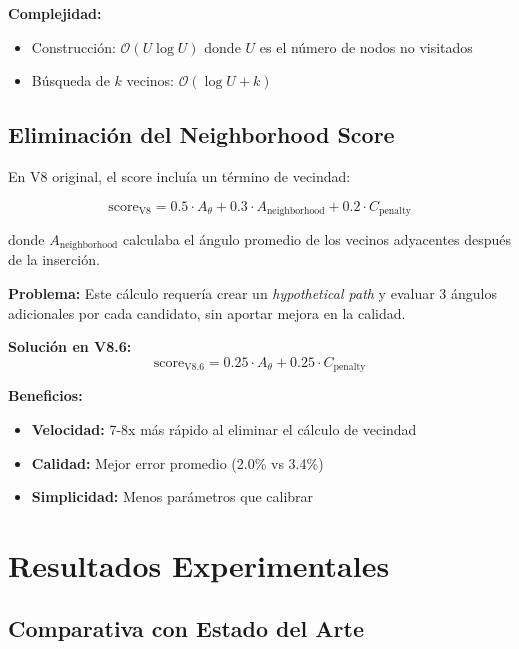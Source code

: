 \documentclass[12pt, a4paper]{article}
\begin{document}
\textbf{Complejidad:}
\begin{itemize}
    \item Construcción: $\mathcal{O}(U \log U)$ donde $U$ es el número de nodos no visitados
    \item Búsqueda de $k$ vecinos: $\mathcal{O}(\log U + k)$
\end{itemize}

\subsection{Eliminación del Neighborhood Score}

En V8 original, el score incluía un término de vecindad:

\begin{equation}
\text{score}_{\text{V8}} = 0.5 \cdot A_\theta + 0.3 \cdot A_{\text{neighborhood}} + 0.2 \cdot C_{\text{penalty}}
\end{equation}

donde $A_{\text{neighborhood}}$ calculaba el ángulo promedio de los vecinos adyacentes después de la inserción.

\textbf{Problema:} Este cálculo requería crear un \textit{hypothetical path} y evaluar 3 ángulos adicionales por cada candidato, sin aportar mejora en la calidad.

\textbf{Solución en V8.6:}
\begin{equation}
\text{score}_{\text{V8.6}} = 0.25 \cdot A_\theta + 0.25 \cdot C_{\text{penalty}}
\end{equation}

\textbf{Beneficios:}
\begin{itemize}
    \item \textbf{Velocidad:} 7-8x más rápido al eliminar el cálculo de vecindad
    \item \textbf{Calidad:} Mejor error promedio (2.0\% vs 3.4\%)
    \item \textbf{Simplicidad:} Menos parámetros que calibrar
\end{itemize}

\section{Resultados Experimentales}

\subsection{Comparativa con Estado del Arte}
\end{document}
